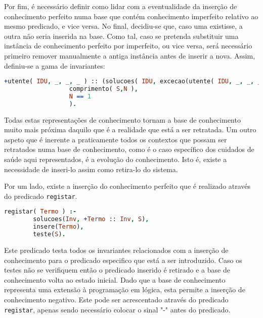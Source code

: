 \documentclass[a4paper]{article}
\begin{document}
\par Por fim, é necessário definir como lidar com a eventualidade da inserção de conhecimento perfeito numa base que contém conhecimento imperfeito relativo ao mesmo predicado, e vice versa. No final, decidiu-se que, caso uma existisse, a outra não seria inserida na base. Como tal, caso se pretenda substituir uma instância de conhecimento perfeito por imperfeito, ou vice versa, será necessário primeiro remover manualmente a antiga instância antes de inserir a nova. Assim, definiu-se a gama de invariantes:

\begin{lstlisting}[language=Prolog, caption=Não permitir a inserção de utente com um ID que já está registado na base de conhecimento como conhecimento imperfeito. ]
+utente( IDU, _, _, _ ) :: (solucoes( IDU, excecao(utente( IDU, _, _, _ )),S ),
                  comprimento( S,N ), 
                  N == 1
                  ).
\end{lstlisting}



Todas estas representações de conhecimento tornam a base de conhecimento muito mais próxima daquilo que é a realidade que está a ser retratada. Um outro aspeto que é inerente a praticamente todos os contextos que possam ser retratados numa base de conhecimento, como é o caso específico dos cuidados de saúde aqui representados, é a evolução do conhecimento. Isto é, existe a necessidade de inseri-lo assim como retira-lo do sistema.

Por um lado, existe a inserção do conhecimento perfeito que é realizado através do predicado \texttt{registar}.

\begin{lstlisting}[language=Prolog, caption=Predicado que permite a evolução da base de conhecimento. ]
registar( Termo ) :-
        solucoes(Inv, +Termo :: Inv, S),
        insere(Termo),
        teste(S).
\end{lstlisting}

Este predicado testa todos os invariantes relacionados com a inserção de conhecimento para o predicado especifico que está a ser introduzido. Caso os testes não se verifiquem então o predicado inserido é retirado e a base de conhecimento volta ao estado inicial. Dado que a base de conhecimento representa uma extensão à programação em lógica, esta permite a inserção de conhecimento negativo. Este pode ser acrescentado através do predicado \texttt{registar}, apenas sendo necessário colocar o sinal "-" antes do predicado.
\end{document}

